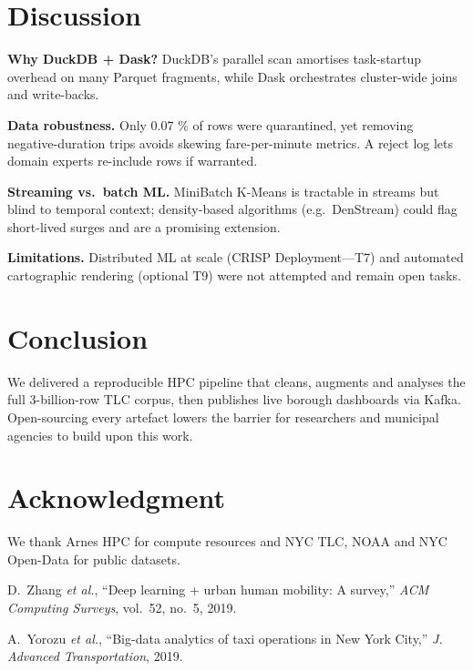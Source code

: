 \documentclass[conference]{IEEEtran}
\begin{document}
\section{Discussion}\label{sec:discussion}
\textbf{Why DuckDB + Dask?}
DuckDB’s parallel scan amortises task-startup overhead on many Parquet
fragments, while Dask orchestrates cluster-wide joins and write-backs.

\textbf{Data robustness.}
Only 0.07 \% of rows were quarantined, yet removing
negative-duration trips avoids skewing fare-per-minute metrics.  A
reject log lets domain experts re-include rows if warranted.

\textbf{Streaming vs.\ batch ML.}
MiniBatch K-Means is tractable in streams but blind to temporal
context; density-based algorithms (e.g.\ DenStream) could flag
short-lived surges and are a promising extension.

\textbf{Limitations.}
Distributed ML at scale (CRISP Deployment—T7) and automated
cartographic rendering (optional T9) were not attempted and remain open
tasks.

\section{Conclusion}\label{sec:conclusion}
We delivered a reproducible HPC pipeline that cleans, augments and
analyses the full 3-billion-row TLC corpus, then publishes live borough
dashboards via Kafka.  Open-sourcing every artefact lowers the barrier
for researchers and municipal agencies to build upon this work.

\section*{Acknowledgment}
We thank Arnes HPC for compute resources and NYC TLC, NOAA and NYC Open-Data
for public datasets.


\begin{thebibliography}{00}

  D.~Zhang \emph{et al.}, “Deep learning + urban human mobility: A survey,”
  \emph{ACM Computing Surveys}, vol.~52, no.~5, 2019.

  A.~Yorozu \emph{et al.}, “Big-data analytics of taxi operations in New York
  City,” \emph{J. Advanced Transportation}, 2019.


\end{thebibliography}
\end{document}
